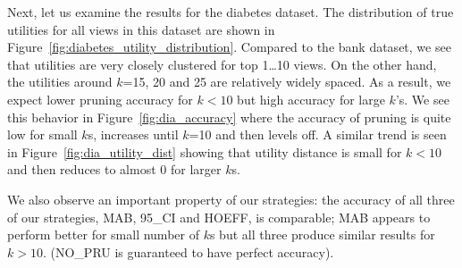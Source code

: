 
 
Next, let us examine the results for the diabetes dataset.
The distribution of true utilities for all views in this dataset are shown in
Figure~\ref{fig:diabetes_utility_distribution}.
Compared to the bank dataset, we see that utilities are very closely
clustered for top 1\ldots10 views.
On the other hand, the utilities around $k$=15, 20 and 25 are relatively widely
spaced.
As a result, we expect lower pruning accuracy for $k<10$ but high accuracy for
large $k$'s.
We see this behavior in Figure~\ref{fig:dia_accuracy} where the accuracy of
pruning is quite low for small $k$s, increases until $k$=10 and then levels off.
A similar trend is seen in Figure~\ref{fig:dia_utility_dist} showing that
utility distance is small for $k<10$ and then reduces to almost 0 for larger
$k$s.

We also observe an important property of our strategies: the accuracy of all
three of our strategies, MAB, 95\_CI and HOEFF, is comparable; MAB appears to
perform better for small number of $k$s but all three produce similar results
for $k>10$. (NO\_PRU is guaranteed to have perfect accuracy).


